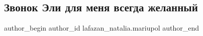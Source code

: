  
 
 
 
 

\subsection{Звонок Эли для меня всегда желанный}
\label{sec:25_03_2023.fb.lafazan_natalia.mariupol.1.zvonok_eli}

\ifcmt
 author_begin
   author_id lafazan_natalia.mariupol
 author_end
\fi

